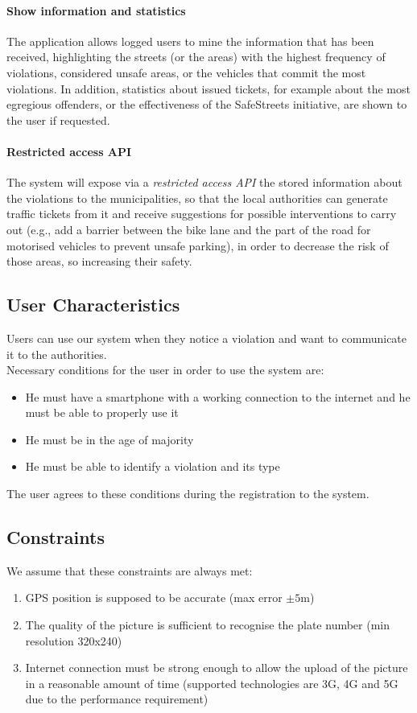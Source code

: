 \paragraph{Show information and statistics}
The application allows logged users to mine the information that has been received, highlighting the streets (or the areas) with the highest frequency of violations, considered unsafe areas, or the vehicles that commit the most violations. In addition, statistics about issued tickets, for example about the most egregious offenders, or the effectiveness of the SafeStreets initiative, are shown to the user if requested. 

\paragraph{Restricted access API}
The system will expose via a \emph{restricted access API} the stored information about the violations to the municipalities, so that the local authorities can generate traffic tickets from it and receive suggestions for possible interventions to carry out (e.g., add a barrier between the bike lane and the part of the road for motorised vehicles to prevent unsafe parking), in order to decrease the risk of those areas, so increasing their safety. 



\subsection{User Characteristics}
	Users can use our system when they notice a violation and want to communicate it to the authorities.\\
 	Necessary conditions for the user in order to use the system are:
 	\begin{itemize}
 		\item He must have a smartphone with a working connection to the internet and he must be able to properly use it
 		\item He must be in the age of majority
 		\item He must be able to identify a violation and its type
 	\end{itemize}
 	The user agrees to these conditions during the registration to the system.
 	
\subsection{Constraints}
	We assume that these constraints are always met:
	\begin{enumerate}[label=\textbf{C\arabic*}]
		\item GPS position is supposed to be accurate (max error $\pm5$m)
		\item The quality of the picture is sufficient to recognise the plate number (min resolution 320x240)
		\item Internet connection must be strong enough to allow the upload of the picture in a reasonable amount of time (supported technologies are 3G, 4G and 5G due to the performance requirement)
	\end{enumerate}
	
